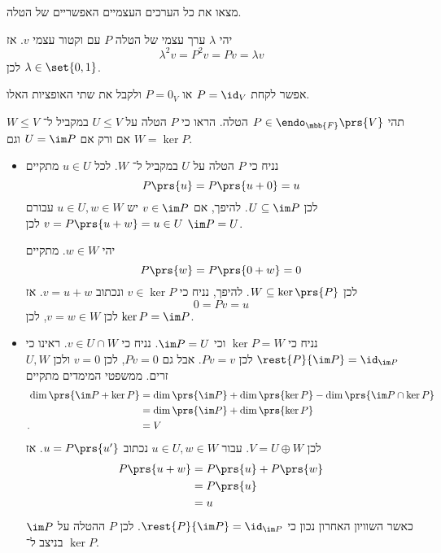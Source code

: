 \documentclass[a4paper,10pt,oneside,openany]{article}
\begin{document}
\begin{exercise}
מצאו את כל הערכים העצמיים האפשריים של הטלה.
\end{exercise}

\begin{solution}
יהי
$\lambda$
ערך עצמי של הטלה
$P$
עם וקטור עצמי
$v$.
אז
\[\lambda^2 v = P^2 v = P v = \lambda v\]
לכן
$\lambda \in \set{0,1}$.

אפשר לקחת
$P = \id_V$
או
$P = 0_V$
ולקבל את שתי האופציות האלו.
\end{solution}

\begin{exercise}
תהי
$P \in \endo_{\mbb{F}}\prs{V}$
הטלה.
הראו כי
$P$
הטלה על
$U \leq V$
במקביל ל־%
$W \leq V$
אם ורק אם
$U = \im P$
וגם
$W = \ker P$.
\end{exercise}

\begin{solution}
\begin{itemize}
\item נניח כי
$P$
הטלה על
$U$
במקביל ל־%
$W$.
לכל
$u \in U$
מתקיים
\[P\prs{u} = P\prs{u+0} = u\]
לכן
$U \subseteq \im P$.
להיפך, אם
$v \in \im P$
יש
$u \in U, w \in W$
עבורם
$v = P\prs{u+w} = u \in U$
לכן
$\im P = U$.

יהי
$w \in W$.
מתקיים
\[P\prs{w} = P\prs{0+w} = 0\]
לכן
$W \subseteq \ker\prs{P}$.
להיפך, נניח כי
$v \in \ker P$
ונכתוב
$v = u + w$.
אז
\[0 = Pv = u\]
לכן
$v = w \in W$,
לכן
$\ker P = \im P$.

\item נניח כי
$\ker P = W$
וכי
$\im P = U$.
נניח כי
$v \in U \cap W$.
ראינו כי
$\rest{P}{\im P} = \id_{\im P}$
לכן
$Pv = v$.
אבל גם
$Pv = 0$,
לכן
$v = 0$
ולכן
$U,W$
זרים.
ממשפטי המימדים מתקיים
\begin{align*}
\dim \prs{\im P + \ker P} &=
\dim\prs{\im P} + \dim\prs{\ker P} - \dim\prs{\im P \cap \ker P}
\\&=
\dim\prs{\im P} + \dim\prs{\ker P}
\\ \text{.} \hphantom{\dim \prs{\im P + \ker P}} &= V
\end{align*}
לכן
$V = U \oplus W$.
עבור
$u \in U, w \in W$
נכתוב
$u = P\prs{u'}$.
אז
\begin{align*}
P\prs{u + w} &= P\prs{u} + P\prs{w}
\\&= P\prs{u}
\\&= u
\end{align*}
כאשר השוויון האחרון נכון כי
$\rest{P}{\im P} = \id_{\im P}$.
לכן
$P$
ההטלה על
$\im P$
בניצב ל־%
$\ker P$.
\end{itemize}
\end{solution}
\end{document}
